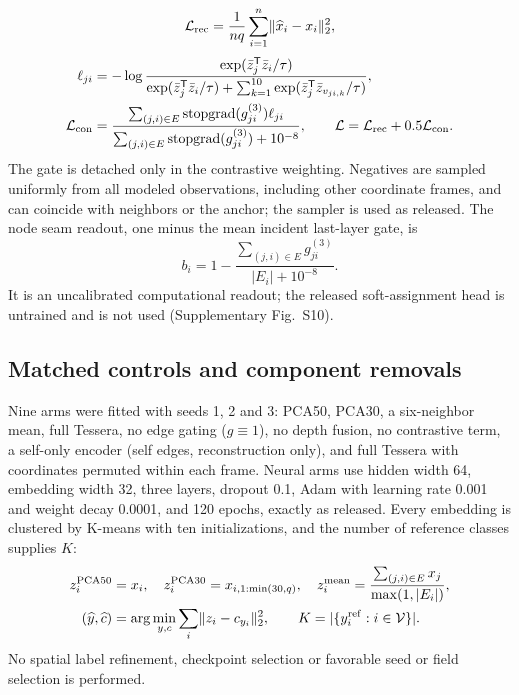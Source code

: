 \documentclass[11pt]{article}
\begin{document}
\begin{equation}
\mathcal L_{\rm rec}=\frac{1}{nq}\sum_{i=1}^n\lVert\widehat x_i-x_i\rVert_2^2,\label{eq:reconstruction}
\end{equation}
\begin{align}
\ell_{ji}&=-\log\frac{\exp(\bar z_j^{\mathsf T}\bar z_i/\tau)}{\exp(\bar z_j^{\mathsf T}\bar z_i/\tau)+\sum_{k=1}^{10}\exp(\bar z_j^{\mathsf T}\bar z_{v_{ji,k}}/\tau)},\label{eq:contrast}\\
\mathcal L_{\rm con}&=\frac{\sum_{(j,i)\in E}\operatorname{stopgrad}(g_{ji}^{(3)})\ell_{ji}}{\sum_{(j,i)\in E}\operatorname{stopgrad}(g_{ji}^{(3)})+10^{-8}},\qquad
\mathcal L=\mathcal L_{\rm rec}+0.5\mathcal L_{\rm con}.\label{eq:loss}
\end{align}
The gate is detached only in the contrastive weighting. Negatives are sampled uniformly from all modeled observations, including other coordinate frames, and can coincide with neighbors or the anchor; the sampler is used as released. The node seam readout, one minus the mean incident last-layer gate, is
\begin{equation}
b_i=1-\frac{\sum_{(j,i)\in E}g_{ji}^{(3)}}{|E_i|+10^{-8}}.\label{eq:seam}
\end{equation}
It is an uncalibrated computational readout; the released soft-assignment head is untrained and is not used (Supplementary Fig.~S10).



\subsection{Matched controls and component removals}
Nine arms were fitted with seeds 1, 2 and 3: PCA50, PCA30, a six-neighbor mean, full Tessera, no edge gating (\(g\equiv1\)), no depth fusion, no contrastive term, a self-only encoder (self edges, reconstruction only), and full Tessera with coordinates permuted within each frame. Neural arms use hidden width 64, embedding width 32, three layers, dropout 0.1, Adam with learning rate 0.001 and weight decay 0.0001, and 120 epochs, exactly as released. Every embedding is clustered by K-means with ten initializations, and the number of reference classes supplies \(K\):
\begin{align}
z_i^{\rm PCA50}&=x_i,\quad z_i^{\rm PCA30}=x_{i,1:\min(30,q)},\quad
z_i^{\rm mean}=\frac{\sum_{(j,i)\in E}x_j}{\max(1,|E_i|)},\label{eq:controls}\\
(\widehat y,\widehat c)&=\arg\min_{y,c}\sum_i\lVert z_i-c_{y_i}\rVert_2^2,
\qquad K=|\{y_i^{\rm ref}:i\in\mathcal V\}|.\label{eq:kmeans}
\end{align}
No spatial label refinement, checkpoint selection or favorable seed or field selection is performed.
\end{document}
